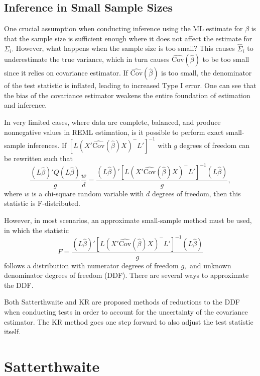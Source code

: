 \documentclass[12pt, twoside]{amherstthesis}
\begin{document}
\hypertarget{inference-in-small-sample-sizes}{%
\subsection{Inference in Small Sample Sizes}\label{inference-in-small-sample-sizes}}

One crucial assumption when conducting inference using the ML estimate for \(\beta\) is that the sample size is sufficient enough where it does not affect the estimate for \(\Sigma_i.\) However, what happens when the sample size is too small? This causes \(\hat\Sigma_i\) to underestimate the true variance, which in turn causes \(\widehat {\text{Cov}}(\hat\beta)\) to be too small since it relies on covariance estimator. If \(\widehat {\text{Cov}}(\hat\beta)\) is too small, the denominator of the test statistic is inflated, leading to increased Type I error. One can see that the bias of the covariance estimator weakens the entire foundation of estimation and inference.

In very limited cases, where data are complete, balanced, and produce nonnegative values in REML estimation, is it possible to perform exact small-sample inferences. If \([L(X'\widehat {\text{Cov}}(\hat\beta)X)^-L']^{-1}\) with \(g\) degrees of freedom can be rewritten such that \[ \frac{(L\hat\beta)'Q(L\hat\beta)}{g}\frac{w}{d} =  \frac{(L\hat\beta)'[L(X'\widehat {\text{Cov}}(\hat\beta)X)^-L']^{-1}(L\hat\beta)}{g},\] where \(w\) is a chi-square random variable with \(d\) degrees of freedom, then this statistic is F-distributed.

However, in most scenarios, an approximate small-sample method must be used, in which the statistic \[F = \frac{(L\hat\beta)'[L(X'\widehat {\text{Cov}}(\hat\beta)X)^-L']^{-1}(L\hat\beta)}{g}\] follows a distribution with numerator degrees of freedom \(g,\) and unknown denominator degrees of freedom (DDF). There are several ways to approximate the DDF.

Both Satterthwaite and KR are proposed methods of reductions to the DDF when conducting tests in order to account for the uncertainty of the covariance estimator. The KR method goes one step forward to also adjust the test statistic itself.

\hypertarget{satterthwaite}{%
\section{Satterthwaite}\label{satterthwaite}}
\end{document}
